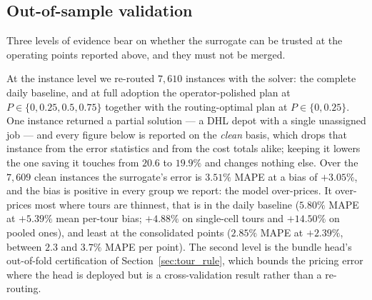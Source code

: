 \documentclass[preprint,12pt,authoryear]{elsarticle}
\begin{document}
\subsection{Out-of-sample validation}
\label{sec:results_validation}

Three levels of evidence bear on whether the surrogate can be trusted at the operating points reported above, and they must not be merged.

At the instance level we re-routed $7{,}610$ instances with the solver: the complete daily baseline, and at full adoption the operator-polished plan at $P \in \{0, 0.25, 0.5, 0.75\}$ together with the routing-optimal plan at $P \in \{0, 0.25\}$. One instance returned a partial solution --- a DHL depot with a single unassigned job --- and every figure below is reported on the \emph{clean} basis, which drops that instance from the error statistics and from the cost totals alike; keeping it lowers the one saving it touches from $20.6$ to $19.9\%$ and changes nothing else. Over the $7{,}609$ clean instances the surrogate's error is $3.51\%$ MAPE at a bias of $+3.05\%$, and the bias is positive in every group we report: the model over-prices. It over-prices most where tours are thinnest, that is in the daily baseline ($5.80\%$ MAPE at $+5.39\%$ mean per-tour bias; $+4.88\%$ on single-cell tours and $+14.50\%$ on pooled ones), and least at the consolidated points ($2.85\%$ MAPE at $+2.39\%$, between $2.3$ and $3.7\%$ MAPE per point). The second level is the bundle head's out-of-fold certification of Section~\ref{sec:tour_rule}, which bounds the pricing error where the head is deployed but is a cross-validation result rather than a re-routing.
\end{document}

